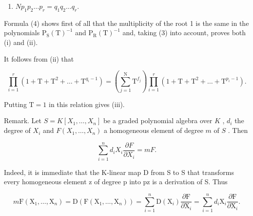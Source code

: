 \begin{enumerate}
\def\labelenumi{(\roman{enumi})}
\setcounter{enumi}{2}
\tightlist
\item
  \(Np_{1}p_{2}\ldots p_{r}=q_{1}q_{2}\ldots q_{r}.\)
\end{enumerate}

Formula (4) shows first of all that the multiplicity of the root 1 is the same in the polynomials \(\mathrm{P}_{\mathrm{S}}(\mathrm{T})^{-1}\) and \(\mathrm{P}_{\mathrm{R}}(\mathrm{T})^{-1}\) and, taking (3) into account, proves both (i) and (ii).

It follows from (ii) that

\[
\prod_ {i = 1} ^ {r} \left(1 + \mathrm{T} + \mathrm{T} ^ {2} + \dots + \mathrm{T} ^ {q _ {i} - 1}\right) = \left(\sum_ {j = 1} ^ {\mathrm{N}} \mathrm{T} ^ {f _ {j}}\right) \prod_ {i = 1} ^ {r} \left(1 + \mathrm{T} + \mathrm{T} ^ {2} + \dots + \mathrm{T} ^ {p _ {i} - 1}\right).
\]

Putting \(\mathrm{T} = 1\) in this relation gives (iii).

Remark. Let \(S = K[X_1, \ldots, X_n]\) be a graded polynomial algebra over \(K\) , \(d_i\) the degree of \(X_i\) and \(F(X_1, \ldots, X_n)\) a homogeneous element of degree \(m\) of \(S\) . Then

\[
\sum_ {i = 1} ^ {n} d _ {i} X _ {i} \frac {\partial F}{\partial X _ {i}} = m F.\tag{5}
\]

Indeed, it is immediate that the K-linear map D from S to S that transforms every homogeneous element z of degree p into pz is a derivation of S. Thus

\[
m \mathrm{F} (\mathrm{X} _ {1}, \dots , \mathrm{X} _ {n}) = \mathrm{D} (\mathrm{F} (\mathrm{X} _ {1}, \dots , \mathrm{X} _ {n})) = \sum_ {i = 1} ^ {n} \mathrm{D} (\mathrm{X} _ {i}) \frac {\partial \mathrm{F}}{\partial \mathrm{X} _ {i}} = \sum_ {i = 1} ^ {n} d _ {i} \mathrm{X} _ {i} \frac {\partial \mathrm{F}}{\partial \mathrm{X} _ {i}}.
\]


